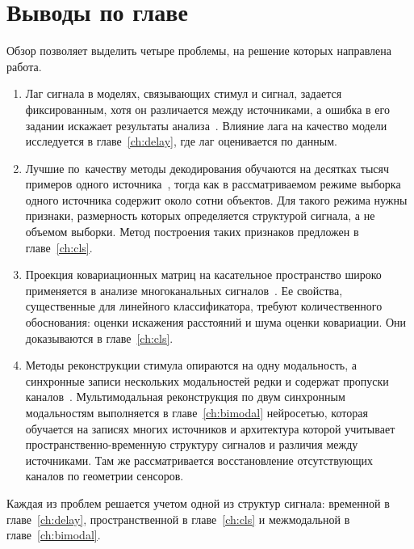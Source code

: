 \section{Выводы по главе}\label{sec1:conclusions}

Обзор позволяет выделить четыре проблемы, на решение которых направлена работа.
\begin{enumerate}
    \item Лаг сигнала в моделях, связывающих стимул и сигнал, задается фиксированным, хотя он различается между источниками, а ошибка в его задании искажает результаты анализа~\cite{handwerker2004variation}. Влияние лага на качество модели исследуется в главе~\ref{ch:delay}, где лаг оценивается по данным.
    \item Лучшие по~качеству методы декодирования обучаются на десятках тысяч примеров одного источника~\cite{scotti2023reconstructingmindseyefmritoimage}, тогда как в рассматриваемом режиме выборка одного источника содержит около сотни объектов. Для такого режима нужны признаки, размерность которых определяется структурой сигнала, а не объемом выборки. Метод построения таких признаков предложен в главе~\ref{ch:cls}.
    \item Проекция ковариационных матриц на касательное пространство широко применяется в анализе многоканальных сигналов~\cite{barachant2011multiclass, congedo2017riemannian, dadi2019benchmarking}. Ее свойства, существенные для линейного классификатора, требуют количественного обоснования: оценки искажения расстояний и шума оценки ковариации. Они доказываются в главе~\ref{ch:cls}.
    \item Методы реконструкции стимула опираются на одну модальность, а синхронные записи нескольких модальностей редки и содержат пропуски каналов~\cite{Telesford2023}. Мультимодальная реконструкция по двум синхронным модальностям выполняется в главе~\ref{ch:bimodal} нейросетью, которая обучается на записях многих источников и архитектура которой учитывает пространственно-временную структуру сигналов и различия между источниками. Там же рассматривается восстановление отсутствующих каналов по геометрии сенсоров.
\end{enumerate}
Каждая из проблем решается учетом одной из структур сигнала: временной в главе~\ref{ch:delay}, пространственной в главе~\ref{ch:cls} и межмодальной в главе~\ref{ch:bimodal}.


